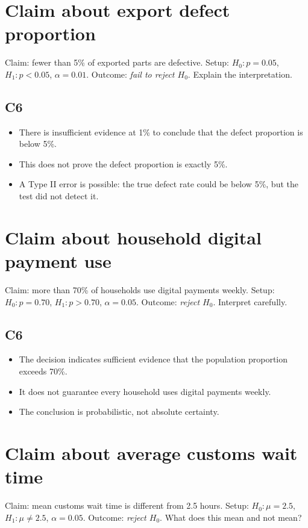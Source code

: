 \begin{ExamProblems}
\item
\section{Claim about export defect proportion}
Claim: fewer than 5\% of exported parts are defective. Setup: \(H_0\colon p=0.05\), \(H_1\colon p<0.05\), \(\alpha=0.01\). Outcome: \textit{fail to reject \(H_0\)}. Explain the interpretation.

\subsection*{C6}
\begin{itemize}
    \item There is insufficient evidence at 1\% to conclude that the defect proportion is below 5\%.
    \item This does not prove the defect proportion is exactly 5\%.
    \item A Type II error is possible: the true defect rate could be below 5\%, but the test did not detect it.
\end{itemize}

\item
\section{Claim about household digital payment use}
Claim: more than 70\% of households use digital payments weekly. Setup: \(H_0\colon p=0.70\), \(H_1\colon p>0.70\), \(\alpha=0.05\). Outcome: \textit{reject \(H_0\)}. Interpret carefully.

\subsection*{C6}
\begin{itemize}
    \item The decision indicates sufficient evidence that the population proportion exceeds 70\%.
    \item It does not guarantee every household uses digital payments weekly.
    \item The conclusion is probabilistic, not absolute certainty.
\end{itemize}

\item
\section{Claim about average customs wait time}
Claim: mean customs wait time is different from 2.5 hours. Setup: \(H_0\colon \mu=2.5\), \(H_1\colon \mu\ne 2.5\), \(\alpha=0.05\). Outcome: \textit{reject \(H_0\)}. What does this mean and not mean?


\end{ExamProblems}
